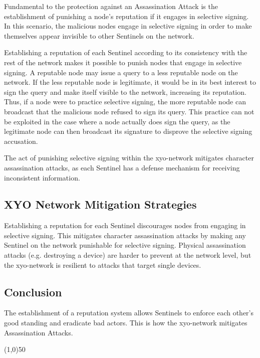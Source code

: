 \documentclass{article}
\begin{document}
Fundamental to the protection against an Assassination Attack is the establishment of punishing a node's reputation if it engages in selective signing. In this scenario, the malicious nodes engage in selective signing in order to make themselves appear invisible to other Sentinels on the network.

Establishing a reputation of each Sentinel according to its consistency with the rest of the network makes it possible to punish nodes that engage in selective signing. A reputable node may issue a query to a less reputable node on the network. If the less reputable node is legitimate, it would be in its best interest to sign the query and make itself visible to the network, increasing its reputation. Thus, if a node were to practice selective signing, the more reputable node can broadcast that the malicious node refused to sign its query. This practice can not be exploited in the case where a node actually does sign the query, as the legitimate node can then broadcast its signature to disprove the selective signing accusation.

The act of punishing selective signing within the \Gls{xyo-network} mitigates character assassination attacks, as each Sentinel has a defense mechanism for receiving inconsistent information.

\subsection{XYO Network Mitigation Strategies}

Establishing a reputation for each Sentinel discourages nodes from engaging in selective signing. This mitigates character assassination attacks by making any Sentinel on the network punishable for selective signing. Physical assassination attacks (e.g. destroying a device) are harder to prevent at the network level, but the \Gls{xyo-network} is resilient to attacks that target single devices.

\subsection{Conclusion}

The establishment of a reputation system allows Sentinels to enforce each other's good standing and eradicate bad actors. This is how the \Gls{xyo-network} mitigates Assassination Attacks.

\begin{center}
\line(1,0){50}
\end{center}
\end{document}

